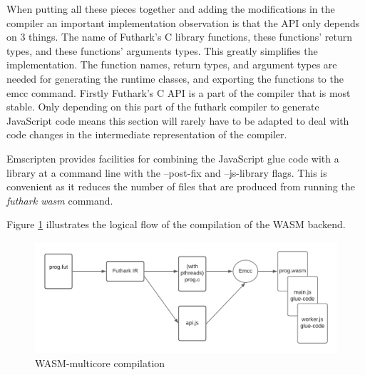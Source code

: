 \documentclass[11pt]{book}
\begin{document}
When putting all these pieces together and adding the modifications in the compiler an important implementation observation is that the API only depends on 3 things. The name of Futhark's C library functions, these functions' return types, and these functions' arguments types. This greatly simplifies the implementation. The function names, return types, and argument types are needed for generating the runtime classes, and exporting the functions to the emcc command. Firstly Futhark's C API is a part of the compiler that is most stable. Only depending on this part of the futhark compiler to generate JavaScript code means this section will rarely have to be adapted to deal with code changes in the intermediate representation of the compiler.


Emscripten provides facilities for combining the JavaScript glue code with a library at a command line with the --post-fix and --js-library flags. This is convenient as it reduces the number of files that are produced from running the \textit{futhark wasm} command.



Figure \ref{fig:wasm} illustrates the logical flow of the compilation of the WASM backend. 

\begin{figure}[htbp]
\centerline{\includegraphics[width=\textwidth]{figures/WASM_MC_compiler.png}}
\caption{WASM-multicore compilation}
\label{fig:wasm}
\end{figure}
\end{document}
